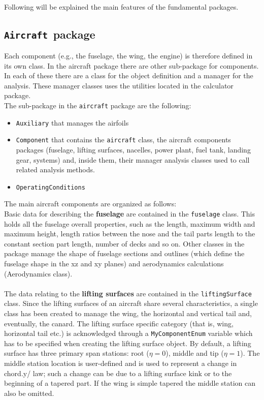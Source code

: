  \noindent \\
 Following will be explained the main features of the fundamental packages.
 
 \subsection{\texttt{Aircraft }package}
 Each component (e.g., the fuselage, the wing, the engine) is therefore defined in its own class. In the aircraft package there are other sub-package for components. In each of these there are a class for the object definition and a manager for the analysis. These manager classes uses the utilities located in the calculator package. \\
 The sub-package in the \texttt{aircraft} package are the following:
 
 \begin{itemize}
 \item \texttt{Auxiliary} that manages the airfoils
 \item  \texttt{Component} that contains the \texttt{aircraft} class, the aircraft components packages (fuselage, lifting surfaces, nacelles, power plant, fuel tank, landing gear, systems) and, inside them, their manager analysis classes used to call related analysis methods. 
 \item \texttt{OperatingConditions} 
 \end{itemize}

The main aircraft components are organized as follows: \\ 

Basic data for describing the {\bfseries fuselage} are contained in the \texttt{fuselage} class. This holds all the fuselage overall properties, such as the length, maximum width and maximum height, length ratios between the nose and the tail parts length to the constant section part length, number of decks and so on. Other classes in the package manage the shape of fuselage sections and outlines (which define the fuselage shape in the xz and xy planes) and aerodynamics calculations (Aerodynamics class).\\ \\

The data relating to the {\bfseries lifting surfaces} are contained in the \texttt{liftingSurface } class. Since the lifting surfaces of an aircraft share several characteristics, a single class has been created to manage the wing, the horizontal and vertical tail and, eventually, the canard. The lifting surface specific category (that is, wing, horizontal tail etc.) is acknowledged through a \texttt{MyComponentEnum} variable which has to be specified when creating the lifting surface object. By default, a lifting surface has three primary span stations: root ($\eta = 0$), middle and tip ($\eta = 1$). The middle station location is user-defined and is used to represent a change in chord.y/ law; such a change can be due to a lifting surface kink or to the beginning of a tapered part. If the wing is simple tapered the middle station can also be omitted.\\ \\


